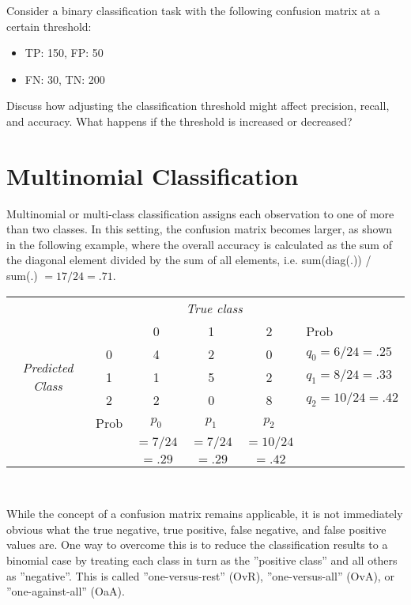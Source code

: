 \begin{exercisebox}
Consider a binary classification task with the following confusion matrix at a certain threshold:
  \begin{itemize}
    \item TP: 150, FP: 50
    \item FN: 30, TN: 200
  \end{itemize}
  Discuss how adjusting the classification threshold might affect precision, recall, and accuracy. What happens if the threshold is increased or decreased?
\end{exercisebox}

\section{Multinomial Classification}

Multinomial or multi-class classification assigns each observation to one of more than two classes. In this setting, the confusion matrix becomes larger, as shown in the following example, where the overall accuracy is calculated as the sum of the diagonal element divided by the sum of all elements, i.e. sum(diag(.)) / sum(.) $=17/24=.71$.

\begin{center}
\vspace{\baselineskip}
\renewcommand{\arraystretch}{1.1}

\begin{tabular}{cc|ccc|l} \hline
     & & \multicolumn{3}{c|}{\emph{True class}} \\
                 &   & 0 & 1 & 2 & Prob \\ \hline
\multirow{3}{1.1cm}{\emph{Predicted Class}} & 0 & 4 & 2 & 0 & $q_0 = 6/24  = .25$ \\ 
                 & 1 & 1 & 5 & 2 & $q_1 = 8/24  = .33$ \\
                 & 2 & 2 & 0 & 8 & $q_2 = 10/24 = .42$ \\ \hline
     & Prob & $p_0$ & $p_1$ & $p_2$ &  \\
     &      & $=7/24$ & $=7/24$ & $=10/24$ &  \\ 
     &      & $=.29$ & $=.29$ & $=.42$ &  \\ \hline
\end{tabular} \\
\vspace{\baselineskip}
\end{center}

While the concept of a confusion matrix remains applicable, it is not immediately obvious what the true negative, true positive, false negative, and false positive values are.  One way to overcome this is to reduce the classification results to a binomial case by treating each class in turn as the ''positive class'' and all others as ''negative''. This is called ''one-versus-rest'' (OvR), ''one-versus-all'' (OvA), or ''one-against-all'' (OaA). 

